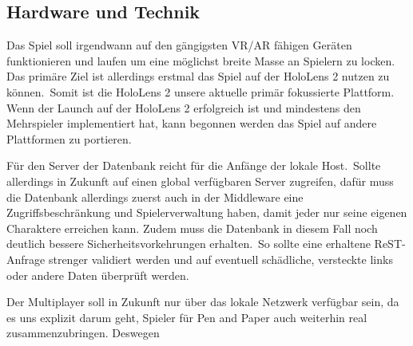 \subsection{Hardware und Technik}\label{subsec:hardware}
Das Spiel soll irgendwann auf den gängigsten VR/AR fähigen Geräten funktionieren und laufen um eine möglichst breite
Masse an Spielern zu locken.
Das primäre Ziel ist allerdings erstmal das Spiel auf der HoloLens 2 nutzen zu können.\ Somit ist die HoloLens 2
unsere aktuelle primär fokussierte Plattform.
Wenn der Launch auf der HoloLens 2 erfolgreich ist und mindestens den Mehrspieler implementiert hat, kann begonnen
werden das Spiel auf andere Plattformen zu portieren.

Für den Server der Datenbank reicht für die Anfänge der lokale Host.\ Sollte allerdings in Zukunft auf einen global
verfügbaren Server zugreifen, dafür muss die Datenbank allerdings zuerst auch in der Middleware eine
Zugriffsbeschränkung und Spielerverwaltung haben, damit jeder nur seine eigenen Charaktere erreichen kann.
Zudem muss die Datenbank in diesem Fall noch deutlich bessere Sicherheitsvorkehrungen erhalten.\ So sollte eine
erhaltene ReST-Anfrage strenger validiert werden und auf eventuell schädliche, versteckte links oder andere Daten
überprüft werden.

Der Multiplayer soll in Zukunft nur über das lokale Netzwerk verfügbar sein, da es uns explizit darum geht, Spieler für
Pen and Paper auch weiterhin real zusammenzubringen.
Deswegen
\subsection{}
